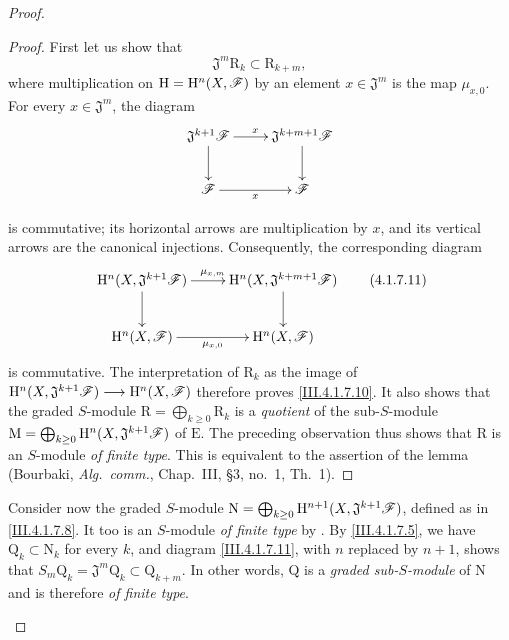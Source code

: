 \begin{proof}
\begin{proof}
First let us show that
\[
  \mathfrak{J}^m\mathrm{R}_k
  \subset
  \mathrm{R}_{k+m},
  \tag{4.1.7.10}
  \label{III.4.1.7.10}
\]
where multiplication on
$\mathrm{H}=\mathrm{H}^n(X,\mathscr{F})$ by an element
$x\in\mathfrak{J}^m$ is the map $\mu_{x,0}$.
For every $x\in\mathfrak{J}^m$, the diagram
\[
  \xymatrix{
    \mathfrak{J}^{k+1}\sh{F}
      \ar[r]^{x}\ar[d]
    &
    \mathfrak{J}^{k+m+1}\sh{F}
      \ar[d]
    \\
    \sh{F}
      \ar[r]_{x}
    &
    \sh{F}
  }
\]


is commutative; its horizontal arrows are multiplication by $x$, and
its vertical arrows are the canonical injections.
Consequently, the corresponding diagram
\[
  \xymatrix{
    \HH^n(X,\mathfrak{J}^{k+1}\sh{F})
      \ar[r]^{\mu_{x,m}}\ar[d]
    &
    \HH^n(X,\mathfrak{J}^{k+m+1}\sh{F})
      \ar[d]
    \\
    \HH^n(X,\sh{F})
      \ar[r]_{\mu_{x,0}}
    &
    \HH^n(X,\sh{F})
  }
  \tag{4.1.7.11}
  \label{III.4.1.7.11}
\]
is commutative.
The interpretation of $\mathrm{R}_k$ as the image of $\mathrm{H}^n(X,\mathfrak{J}^{k+1}\mathscr{F})
\longrightarrow
\mathrm{H}^n(X,\mathscr{F})$
therefore proves \eqref{III.4.1.7.10}.
It also shows that the graded $S$-module $\mathrm{R}=\bigoplus_{k\geq0}\mathrm{R}_k$
is a \emph{quotient} of the sub-$S$-module $\mathrm{M}
=
\bigoplus_{k\geq0}
\mathrm{H}^n(X,\mathfrak{J}^{k+1}\mathscr{F})$
of $\mathrm{E}$.
The preceding observation thus shows that $\mathrm{R}$ is an
$S$-module \emph{of finite type}.
This is equivalent to the assertion of the lemma
(Bourbaki, \emph{Alg.\ comm.}, Chap.~III, \S3, no.~1, Th.~1).
\end{proof}

\begin{env}[4.1.7.12]
\label{III.4.1.7.12}
Consider now the graded $S$-module $\mathrm{N}
=
\bigoplus_{k\geq0}
\mathrm{H}^{n+1}(X,\mathfrak{J}^{k+1}\mathscr{F})$,
defined as in \eqref{III.4.1.7.8}.
It too is an $S$-module \emph{of finite type} by .
By \eqref{III.4.1.7.5}, we have
$\mathrm{Q}_k\subset\mathrm{N}_k$ for every $k$, and diagram
\eqref{III.4.1.7.11}, with $n$ replaced by $n+1$, shows that $S_m\mathrm{Q}_k
=
\mathfrak{J}^m\mathrm{Q}_k
\subset
\mathrm{Q}_{k+m}$.
In other words, $\mathrm{Q}$ is a \emph{graded sub-$S$-module} of
$\mathrm{N}$ and is therefore \emph{of finite type}.
\end{env}


\end{proof}
